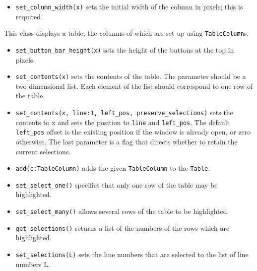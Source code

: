 \begin{itemize}
\item\noindent\texttt{set\_column\_width(x)} sets the initial width of the column in pixels;
this is required.

\end{itemize}

\medskip{}

This class displays a table, the columns of which are set up using
 \texttt{TableColumn}s.

\begin{itemize}
\item\noindent\texttt{set\_button\_bar\_height(x)} sets the height of the buttons at the top
in pixels.

\item\noindent\texttt{set\_contents(x)} sets the contents of the table. The parameter should be
a two dimensional list. Each element of the list should correspond
to one row of the table.

\item\noindent\texttt{set\_contents(x, line:1, left\_pos, preserve\_selections)} sets the
contents to x and sets the position to \texttt{line} and
\texttt{left\_pos}. The default \texttt{left\_pos} offset is
the existing position if the window is already open, or zero
otherwise. The
last parameter is a flag that directs whether to retain the current selections.


\item\noindent\texttt{add(c:TableColumn)} adds the given  \texttt{TableColumn} to the  \texttt{Table}.

\item\noindent\texttt{set\_select\_one()} specifies that only one row of the table may be
highlighted.

\item\noindent\texttt{set\_select\_many()} allows several rows of the table to be
highlighted.

\item\noindent\texttt{get\_selections()} returns a list of the numbers of the rows which are
highlighted.

\item\noindent\texttt{set\_selections(L)} sets the line numbers that are selected to the
list of line numbers L.
\end{itemize}


